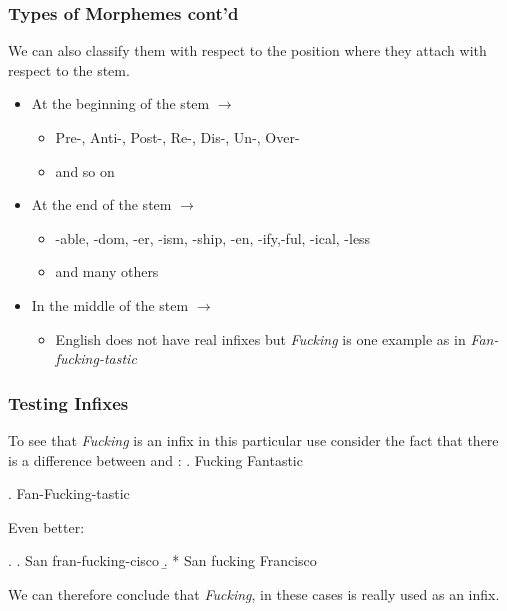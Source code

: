 \begin{frame}
  \frametitle{Types of Morphemes cont'd}

We can also classify them with respect to the position where they attach with respect to the stem.

\begin{itemize}
\item At the beginning of the stem $\rightarrow$ 
  \begin{itemize}
  \item Pre-, Anti-, Post-, Re-, Dis-, Un-, Over- 
  \item and so on 
  \end{itemize}
\item At the end of the stem $\rightarrow$ 
  \begin{itemize}
  \item -able, -dom, -er, -ism, -ship, -en, -ify,-ful, -ical, -less
  \item and many others
  \end{itemize}
\item In the middle of the stem $\rightarrow$ 
  \begin{itemize}
  \item English does not have real infixes but \textit{Fucking} is one example as in \textit{Fan-fucking-tastic}
  \end{itemize}

\end{itemize}

\end{frame}
\frametitle{Testing Infixes}
To see that \textit{Fucking} is an infix in this particular use consider the fact that there is a difference between \Next and \NNext :
\ex. Fucking Fantastic

\ex. Fan-Fucking-tastic

Even better:

\ex. 
\a. San fran-fucking-cisco 
\b. * San fucking Francisco

We can therefore conclude that \textit{Fucking}, in these cases is really used as an infix.

